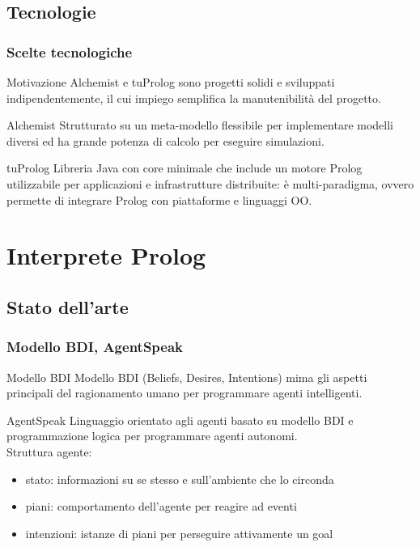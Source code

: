 \documentclass[handout]{beamer}\mode<presentation>{\usetheme{AMSCesenaBleu}}
\begin{document}
\subsection{Tecnologie}
\begin{frame}
\frametitle{Scelte tecnologiche}
\begin{block}{Motivazione}
Alchemist e tuProlog sono progetti solidi e sviluppati indipendentemente, il cui impiego semplifica la manutenibilità del progetto. 
\end{block}

\begin{block}{Alchemist}
Strutturato su un meta-modello flessibile per implementare modelli diversi ed ha grande potenza di calcolo per eseguire simulazioni.
\end{block}

\begin{block}{tuProlog}
Libreria Java con core minimale che include un motore Prolog utilizzabile per applicazioni e infrastrutture distribuite: è multi-paradigma, ovvero permette di integrare Prolog con piattaforme e linguaggi OO.
\end{block}
\end{frame}



\section{Interprete Prolog}

\subsection{Stato dell'arte}
\begin{frame}
\frametitle{Modello BDI, AgentSpeak}
\begin{block}{Modello BDI}
Modello BDI (Beliefs, Desires, Intentions) mima gli aspetti principali del ragionamento umano per programmare agenti intelligenti.
\end{block}
\begin{block}{AgentSpeak}
Linguaggio orientato agli agenti basato su modello BDI e programmazione logica per programmare agenti autonomi.
\\\vspace{0.2cm}
Struttura agente:
\begin{itemize}
\item \alert{stato}: informazioni su se stesso e sull'ambiente che lo circonda
\item \alert{piani}: comportamento dell'agente per reagire ad eventi
\item \alert{intenzioni}: istanze di piani per perseguire attivamente un goal
\end{itemize}
\end{block}
\end{frame}
\end{document}
